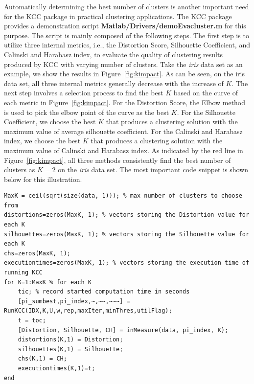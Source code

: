 \documentclass[10pt]{acmtrans2e}
\newcommand{\package}[1]{\textsf{#1}\xspace} %
\newcommand{\function}[1]{\textbf{\texttt{#1}}}
\begin{document}
Automatically determining the best number of clusters is another important need for the \package{KCC} package in practical clustering applications. The \package{KCC} package provides a demonstration script \textbf{Matlab/Drivers/demoEvacluster.m} for this purpose. The script is mainly composed of the following steps. The first step is to utilize three internal metrics, i.e., the Distortion Score, Silhouette Coefficient, and Calinski and Harabasz index, to evaluate the quality of clustering results produced by KCC with varying number of clusters. Take the \textit{iris} data set as an example, we show the results in Figure~\ref{fig:kimpact}. As can be seen, on the iris data set, all three internal metrics generally decrease with the increase of $K$. The next step involves a selection process to find the best $K$ based on the curve of each metric in Figure~\ref{fig:kimpact}. For the Distortion Score, the Elbow method~\cite{bholowalia2014ebk} is used to pick the elbow point of the curve as the best $K$. For the Silhouette Coefficient, we choose the best $K$ that produces a clustering solution with the maximum value of average silhouette coefficient. For the Calinski and Harabasz index, we choose the best $K$ that produces a clustering solution with the maximum value of Calinski and Harabasz index. As indicated by the red line in Figure~\ref{fig:kimpact}, all three methods consistently find the best number of clusters as $K=2$ on the \textit{iris} data set. The most important code snippet is shown below for this illustration.
\begin{lstlisting}[caption={Using \function{demoEvacluster.m} to determine the best number of clusters for \package{KCC}.},label=lst:findbestk]
MaxK = ceil(sqrt(size(data, 1))); % max number of clusters to choose from
distortions=zeros(MaxK, 1); % vectors storing the Distortion value for each K
silhouettes=zeros(MaxK, 1); % vectors storing the Silhouette value for each K
chs=zeros(MaxK, 1);
executiontimes=zeros(MaxK, 1); % vectors storing the execution time of running KCC
for K=1:MaxK % for each K
    tic; % record started computation time in seconds
    [pi_sumbest,pi_index,~,~~,~~~] = RunKCC(IDX,K,U,w,rep,maxIter,minThres,utilFlag);
    t = toc;
    [Distortion, Silhouette, CH] = inMeasure(data, pi_index, K);
    distortions(K,1) = Distortion;
    silhouettes(K,1) = Silhouette;
    chs(K,1) = CH;
    executiontimes(K,1)=t;
end
\end{lstlisting}

\end{document}
